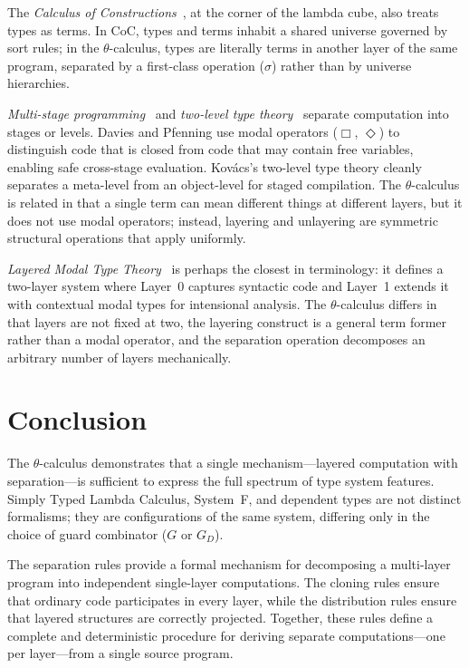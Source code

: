 \documentclass[11pt,letterpaper]{article}
\theoremstyle{definition}
\begin{document}
The \emph{Calculus of Constructions}~\cite{coquand1988}, at the corner of
the lambda cube, also treats types as terms. In CoC, types and terms inhabit
a shared universe governed by sort rules; in the $\theta$-calculus, types are
literally terms in another layer of the same program, separated by a
first-class operation ($\sigma$) rather than by universe hierarchies.

\emph{Multi-stage programming}~\cite{davies2001} and \emph{two-level type
theory}~\cite{kovacs2022} separate computation into stages or levels. Davies
and Pfenning use modal operators ($\Box$, $\Diamond$) to distinguish code
that is closed from code that may contain free variables, enabling safe
cross-stage evaluation. Kov\'{a}cs's two-level type theory cleanly separates
a meta-level from an object-level for staged compilation. The
$\theta$-calculus is related in that a single term can mean different things
at different layers, but it does not use modal operators; instead, layering
and unlayering are symmetric structural operations that apply uniformly.

\emph{Layered Modal Type Theory}~\cite{jang2024} is perhaps the closest in
terminology: it defines a two-layer system where Layer~0 captures syntactic
code and Layer~1 extends it with contextual modal types for intensional
analysis. The $\theta$-calculus differs in that layers are not fixed at two,
the layering construct is a general term former rather than a modal operator,
and the separation operation decomposes an arbitrary number of layers
mechanically.


\section{Conclusion}\label{sec:conclusion}

The $\theta$-calculus demonstrates that a single mechanism---layered
computation with separation---is sufficient to express the full spectrum of
type system features. Simply Typed Lambda Calculus, System~F,
and dependent types are not distinct formalisms; they are
configurations of the same system, differing only in the choice of guard
combinator ($G$ or $G_D$).

The separation rules provide a formal mechanism for decomposing a multi-layer
program into independent single-layer computations. The cloning rules ensure
that ordinary code participates in every layer, while the distribution rules
ensure that layered structures are correctly projected. Together, these rules
define a complete and deterministic procedure for deriving separate
computations---one per layer---from a single source program.
\end{document}
